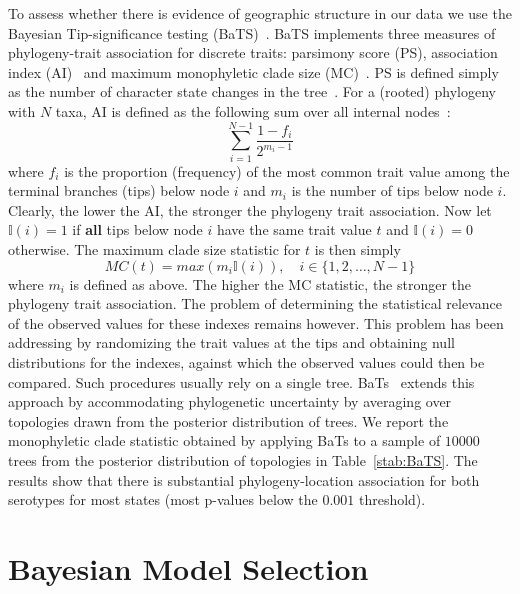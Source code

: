 \documentclass[a4paper,10pt]{article}
\begin{document}
To assess whether there is evidence of geographic structure in our data we use the Bayesian Tip-significance testing (BaTS)~\cite{M-bats}.
BaTS implements three measures of phylogeny-trait association for discrete traits: parsimony score (PS), association index (AI)~\cite{Wang2001} and maximum monophyletic clade size (MC)~\cite{Salemi2005}.
PS is defined simply as the number of character state changes in the tree~\cite{Fitch1971}.
For a (rooted) phylogeny with $N$ taxa, AI is defined as the following sum over all internal nodes~\cite{Wang2001}:
\begin{equation}
 \sum_{i=1}^{N-1}\frac{1-f_i}{2^{m_i - 1}}
\end{equation}
where $f_i$ is the proportion (frequency) of the most common trait value among the terminal branches (tips) below node $i$ and $m_i$ is the number of tips below node $i$.
Clearly, the lower the AI, the stronger the phylogeny trait association.
Now let $\mathbb{I}(i) = 1$ if \textbf{all} tips below node $i$ have the same trait value $t$ and $\mathbb{I}(i) = 0$ otherwise.
The maximum clade size statistic for $t$ is then simply~\cite{Salemi2005}
\begin{equation}
MC(t) = max(m_i\mathbb{I}(i)), \quad i \in \{1, 2, \ldots, N-1\} 
\end{equation}
where $m_i$ is defined as above.
The higher the MC statistic, the stronger the phylogeny trait association.
The problem of determining the statistical relevance of the observed values for these indexes remains however.
This problem has been addressing by randomizing the trait values at the tips and obtaining null distributions for the indexes, against which the observed values could then be compared.
Such procedures usually rely on a single tree.
BaTs~\cite{M-bats} extends this approach by accommodating phylogenetic uncertainty by averaging over topologies drawn from the posterior distribution of trees.
We report the monophyletic clade statistic obtained by applying BaTs to a sample of $10 000$ trees from the posterior distribution of topologies in Table~\ref{stab:BaTS}.
The results show that there is substantial phylogeny-location association for both serotypes for most states (most p-values below the $0.001$ threshold).

\section*{Bayesian Model Selection}
\end{document}
